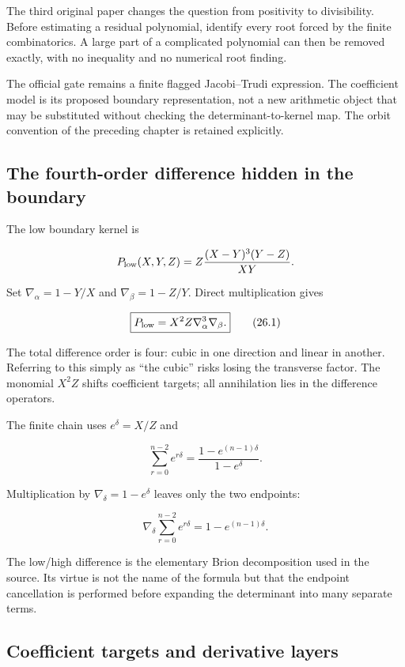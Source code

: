 \documentclass[
  10pt,
  a4paper,
  10pt,
  oneside,
  openany]{book}
\begin{document}
The third original paper changes the question from positivity to
divisibility. Before estimating a residual polynomial, identify every
root forced by the finite combinatorics. A large part of a complicated
polynomial can then be removed exactly, with no inequality and no
numerical root finding.

The official gate remains a finite flagged Jacobi--Trudi expression. The
coefficient model is its proposed boundary representation, not a new
arithmetic object that may be substituted without checking the
determinant-to-kernel map. The orbit convention of the preceding chapter
is retained explicitly.

\subsection{The fourth-order difference hidden in the
boundary}\label{the-fourth-order-difference-hidden-in-the-boundary}

The low boundary kernel is

\[
 P_{\rm low}(X,Y,Z)=Z\frac{(X-Y)^3(Y-Z)}{XY}.
\]

Set \(\nabla_\alpha=1-Y/X\) and \(\nabla_\beta=1-Z/Y\). Direct
multiplication gives

\[
 \boxed{P_{\rm low}=X^2Z\nabla_\alpha^3\nabla_\beta.}
 \tag{26.1}\label{eq:26.1}
\]

The total difference order is four: cubic in one direction and linear in
another. Referring to this simply as ``the cubic'' risks losing the
transverse factor. The monomial \(X^2Z\) shifts coefficient targets; all
annihilation lies in the difference operators.

The finite chain uses \(e^\delta=X/Z\) and

\[
 \sum_{r=0}^{n-2}e^{r\delta}
 =\frac{1-e^{(n-1)\delta}}{1-e^\delta}.
\]

Multiplication by \(\nabla_\delta=1-e^\delta\) leaves only the two
endpoints:

\[
 \nabla_\delta\sum_{r=0}^{n-2}e^{r\delta}
 =1-e^{(n-1)\delta}.
 \tag{26.2}\label{eq:26.2}
\]

The low/high difference is the elementary Brion decomposition used in
the source. Its virtue is not the name of the formula but that the
endpoint cancellation is performed before expanding the determinant into
many separate terms.

\subsection{Coefficient targets and derivative
layers}\label{coefficient-targets-and-derivative-layers}
\end{document}

